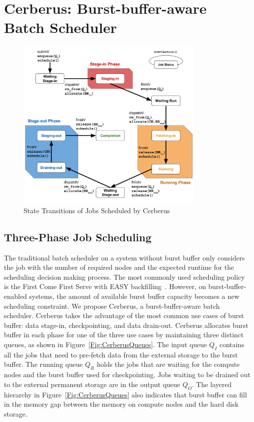 \section{Cerberus: Burst-buffer-aware Batch Scheduler}
\label{Sec:Scheduler}

\begin{figure}[htp]
\centering
        \includegraphics[width=3.6in]{3PhaseJobFSM}
        \caption{State Transitions of Jobs Scheduled by Cerberus}
\label{Fig:JobFSM}
\end{figure}

\subsection{Three-Phase Job Scheduling}

The traditional batch scheduler on a system without burst buffer only considers
the job with the number of required nodes and the expected runtime for the scheduling decision making process.
The most commonly used scheduling policy is the First Come First Serve with EASY backfilling~\cite{tsafrir-tpds-2007}.
However, on burst-buffer-enabled systems,
the amount of available burst buffer capacity becomes a new scheduling constraint.
We propose Cerberus, a burst-buffer-aware batch scheduler.
Cerberus takes the advantage of the most common use cases of burst buffer:
data stage-in, checkpointing, and data drain-out.
Cerberus allocates burst buffer in each phase for one of the three use cases
by maintaining three distinct queues, as shown in Figure~\ref{Fig:CerberusQueues}.
The input queue $Q_I$ contains all the jobs that need to pre-fetch data from the external storage to the burst buffer.
The running queue $Q_R$ holds the jobs that are waiting for the compute nodes and the burst buffer used for checkpointing.
Jobs waiting to be drained out to the external permanent storage are in the output queue $Q_O$.
The layered hierarchy in Figure~\ref{Fig:CerberusQueues} also indicates that burst buffer
can fill in the memory gap between the memory on compute nodes and the hard disk storage.

